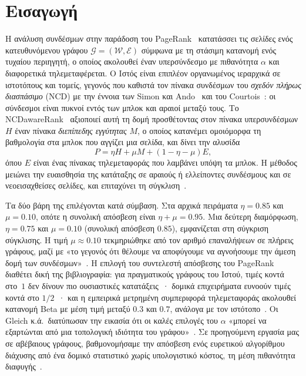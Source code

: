 \documentclass[11pt,a4paper]{article}
\theoremstyle{definition}
\theoremstyle{remark}
\begin{document}
\section{Εισαγωγή}
\label{sec:intro}

Η ανάλυση συνδέσμων στην παράδοση του PageRank~\cite{page99,langville06} κατατάσσει τις σελίδες ενός
κατευθυνόμενου γράφου $\mathcal G=(\mathcal W,\mathcal E)$ σύμφωνα με τη στάσιμη κατανομή ενός τυχαίου
περιηγητή, ο οποίος ακολουθεί έναν υπερσύνδεσμο με πιθανότητα $\alpha$ και διαφορετικά
τηλεμεταφέρεται. Ο Ιστός είναι επιπλέον οργανωμένος ιεραρχικά σε ιστοτόπους και τομείς, γεγονός που
καθιστά τον πίνακα συνδέσμων του \emph{σχεδόν πλήρως διασπάσιμο} (NCD) με την έννοια των Simon και
Ando~\cite{simon61} και του Courtois~\cite{courtois77}: οι σύνδεσμοι είναι πυκνοί εντός των μπλοκ και
αραιοί μεταξύ τους. Το NCDawareRank~\cite{ng13} αξιοποιεί αυτή τη δομή προσθέτοντας στον πίνακα
υπερσυνδέσμων $H$ έναν πίνακα \emph{διεπίπεδης εγγύτητας} $M$, ο οποίος κατανέμει ομοιόμορφα τη
βαθμολογία στα μπλοκ που αγγίζει μια σελίδα, και δίνει την αλυσίδα
\begin{equation}
P=\eta H+\mu M+(1-\eta-\mu)E,
\label{eq:ncd}
\end{equation}
όπου $E$ είναι ένας πίνακας τηλεμεταφοράς που λαμβάνει υπόψη τα μπλοκ. Η μέθοδος μειώνει την
ευαισθησία της κατάταξης σε αραιούς ή ελλείποντες συνδέσμους και σε νεοεισαχθείσες σελίδες, και
επιταχύνει τη σύγκλιση~\cite{ng13,ng20}.

Τα δύο βάρη της επιλέγονται κατά σύμβαση. Στα αρχικά πειράματα $\eta=0.85$ και $\mu=0.10$, οπότε η
συνολική απόσβεση είναι $\eta+\mu=0.95$. Μια δεύτερη διαμόρφωση, $\eta=0.75$ και $\mu=0.10$ (συνολική
απόσβεση $0.85$), εμφανίζεται στη σύγκριση σύγκλισης. Η τιμή $\mu\approx0.10$ τεκμηριώθηκε από τον
αριθμό επαναλήψεων σε πλήρεις γράφους, μαζί με «το γεγονός ότι θέλουμε να αποφύγουμε να αγνοήσουμε την
άμεση δομή των συνδέσμων»~\cite[§3.2.2]{ng13}. Η επιλογή του συντελεστή απόσβεσης του PageRank
διαθέτει δική της βιβλιογραφία: για πραγματικούς γράφους του Ιστού, τιμές κοντά στο~$1$ δεν δίνουν
πιο ουσιαστικές κατατάξεις~\cite{boldi05,boldi09}· δομικά επιχειρήματα ευνοούν τιμές κοντά στο
$1/2$~\cite{avrachenkov08}· και η εμπειρικά μετρημένη συμπεριφορά τηλεμεταφοράς ακολουθεί κατανομή
Beta με μέση τιμή μεταξύ $0.3$ και $0.7$, ανάλογα με τον ιστότοπο~\cite{gleich10}. Οι Gleich κ.ά.\
διατύπωσαν την εικασία ότι οι καλές επιλογές του $\alpha$ «μπορεί να εξαρτώνται από μια τοπολογική
ιδιότητα του γράφου»~\cite{gleich10}. Σε προηγούμενη εργασία μας σε αβέβαιους γράφους, βαθμονομήσαμε
την απόσβεση ενός ευρετικού αλγορίθμου διάχυσης από ένα δομικό στατιστικό χωρίς υπολογιστικό κόστος,
τη μέση πιθανότητα διαφυγής~\cite{konstantellos26}.
\end{document}
